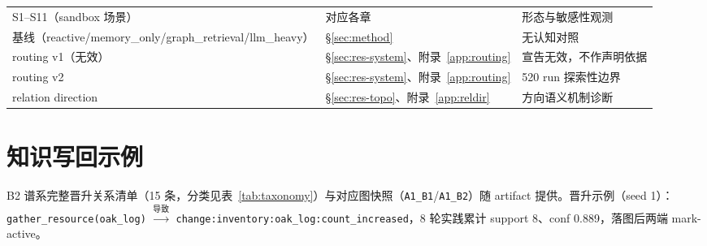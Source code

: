 \documentclass[10pt,a4paper]{ctexart}
\begin{document}
\begin{table}[ht]
\begin{tabular}{L{4.6cm}L{3.4cm}L{6.0cm}}
S1--S11（sandbox 场景） & 对应各章 & 形态与敏感性观测 \\
基线（reactive/memory\_only/\allowbreak graph\_retrieval/llm\_heavy） & \S\ref{sec:method} & 无认知对照 \\
routing v1（无效） & \S\ref{sec:res-system}、附录~\ref{app:routing} & 宣告无效，不作声明依据 \\
routing v2 & \S\ref{sec:res-system}、附录~\ref{app:routing} & 520 run 探索性边界 \\
relation direction & \S\ref{sec:res-topo}、附录~\ref{app:reldir} & 方向语义机制诊断 \\
\bottomrule
\end{tabular}
\end{table}

\section{知识写回示例}
\label{app:wb}
B2 谱系完整晋升关系清单（15 条，分类见表~\ref{tab:taxonomy}）与对应图快照（\texttt{A1\_B1}/\texttt{A1\_B2}）随 artifact 提供。晋升示例（seed 1）：\texttt{gather\_resource(oak\_log)} $\xrightarrow{\texttt{导致}}$ \texttt{change:inventory:oak\_log:count\_increased}，8 轮实践累计 support 8、conf 0.889，落图后两端 mark-active。
\end{document}
